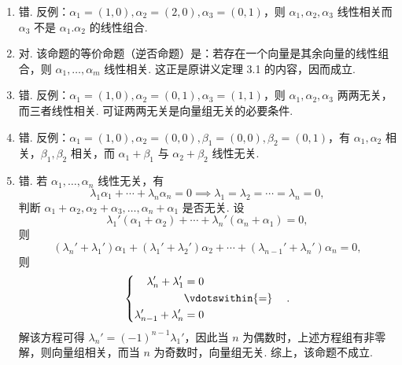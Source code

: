 \documentclass[12pt,fontset=fandol]{ctexart}
\begin{document}
\begin{solve}
\begin{enumerate}
                \item 错. 反例：$\alpha_1=(1,0),\alpha_2=(2,0),\alpha_3=(0,1)$，则 $\alpha_1,\alpha_2,\alpha_3$ 线性相关而 $\alpha_3$ 不是 $\alpha_1.\alpha_2$ 的线性组合.

                \item 对. 该命题的等价命题（逆否命题）是：若存在一个向量是其余向量的线性组合，则 $\alpha_1,\ldots,\alpha_m$ 线性相关. 这正是原讲义定理 3.1 的内容，因而成立.

                \item 错. 反例：$\alpha_1=(1,0),\alpha_2=(0,1),\alpha_3=(1,1)$，则 $\alpha_1,\alpha_2,\alpha_3$ 两两无关，而三者线性相关. 可证两两无关是向量组无关的必要条件.

                \item 错. 反例：$\alpha_1=(1,0),\alpha_2=(0,0),\beta_1=(0,0),\beta_2=(0,1)$，有 $\alpha_1,\alpha_2$ 相关，$\beta_1,\beta_2$ 相关，而 $\alpha_1+\beta_1$ 与 $\alpha_2+\beta_2$ 线性无关.

                \item 错. 若 $\alpha_1,\ldots,\alpha_n$ 线性无关，有
                    \[\lambda_1\alpha_1+\cdots+\lambda_n\alpha_n=0\implies\lambda_1=\lambda_2=\cdots=\lambda_n=0,\]
                    判断 $\alpha_1+\alpha_2,\alpha_2+\alpha_3,\ldots,\alpha_n+\alpha_1$ 是否无关. 设
                    \[\lambda_1'(\alpha_1+\alpha_2)+\cdots+\lambda_n'(\alpha_n+\alpha_1)=0,\]
                    则
                    \[(\lambda_n'+\lambda_1')\alpha_1+(\lambda_1'+\lambda_2')\alpha_2+\cdots+(\lambda_{n-1}'+\lambda_{n}')\alpha_n=0,\]
                    则
                    \[\begin{cases} \begin{aligned}
                                \lambda_n'+\lambda_1'       & = 0               \\
                                                            & \vdotswithin{ = } \\
                                \lambda_{n-1}'+\lambda_{n}' & = 0               \\
                            \end{aligned} \end{cases}.\]
                    解该方程可得 $\lambda_n'=(-1)^{n-1}\lambda_1'$，因此当 $n$ 为偶数时，上述方程组有非零解，则向量组相关，而当 $n$ 为奇数时，向量组无关. 综上，该命题不成立.


\end{enumerate}
\end{solve}
\end{document}
